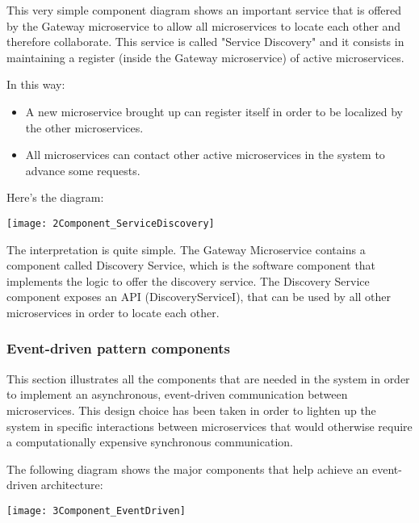 \begin{minipage}{\linewidth}
	
	This very simple component diagram shows an important service that is offered by the Gateway microservice to allow all microservices to locate each other and therefore collaborate. This service is called "Service Discovery" and it consists in maintaining a register (inside the Gateway microservice) of active microservices. 
	
	In this way:
	\begin{itemize}
		\item A new microservice brought up can register itself in order to be localized by the other microservices.
		\item All microservices can contact other active microservices in the system to advance some requests.
	\end{itemize}
	
	Here's the diagram:
	
	\vspace{2cm}
	\texttt{[image: 2Component\_ServiceDiscovery]}
	
\end{minipage}

	The interpretation is quite simple. The Gateway Microservice contains a component called Discovery Service, which is the software component that implements the logic to offer the discovery service. The Discovery Service component exposes an API (DiscoveryServiceI), that can be used by all other microservices in order to locate each other. 

\subsubsection{Event-driven pattern components}
\begin{minipage}{\linewidth}
	This section illustrates all the components that are needed in the system in order to implement an asynchronous, event-driven communication between microservices. This design choice has been taken in order to lighten up the system in specific interactions between microservices that would otherwise require a computationally expensive synchronous communication.
	
	The following diagram shows the major components that help achieve an event-driven architecture:
	
	\vspace{2cm}
	\texttt{[image: 3Component\_EventDriven]}
	
	\vspace{2cm}
	
\end{minipage}

